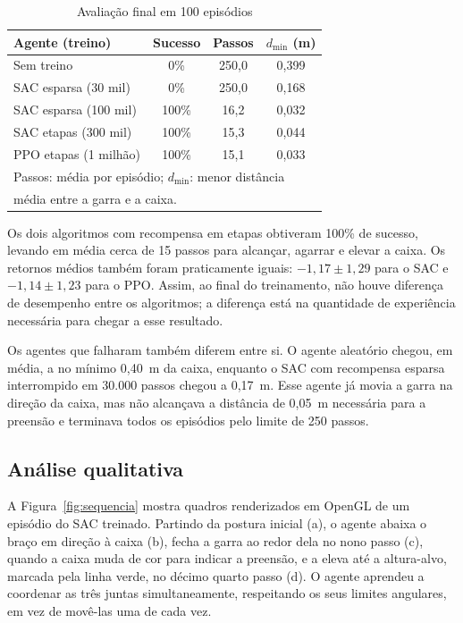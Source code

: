 \documentclass[conference]{IEEEtran}
\begin{document}
\begin{table}[htb]
    \centering
    \caption{Avaliação final em 100 episódios}
    \label{tab:final}
    \begin{tabular}{lccc}
        \hline
        Agente (treino) & Sucesso & Passos & $d_{\min}$ (m) \\
        \hline
        Sem treino                & 0\%   & 250,0 & 0,399 \\
        SAC esparsa (30 mil)      & 0\%   & 250,0 & 0,168 \\
        SAC esparsa (100 mil)     & 100\% & 16,2  & 0,032 \\
        SAC etapas (300 mil)      & 100\% & 15,3  & 0,044 \\
        PPO etapas (1 milhão)     & 100\% & 15,1  & 0,033 \\
        \hline
        \multicolumn{4}{l}{\footnotesize Passos: média por episódio; $d_{\min}$: menor distância} \\
        \multicolumn{4}{l}{\footnotesize média entre a garra e a caixa.}
    \end{tabular}
\end{table}

Os dois algoritmos com recompensa em etapas obtiveram 100\% de sucesso, levando em média cerca de 15 passos para alcançar, agarrar e elevar a caixa. Os retornos médios também foram praticamente iguais: $-1{,}17 \pm 1{,}29$ para o SAC e $-1{,}14 \pm 1{,}23$ para o PPO. Assim, ao final do treinamento, não houve diferença de desempenho entre os algoritmos; a diferença está na quantidade de experiência necessária para chegar a esse resultado.

Os agentes que falharam também diferem entre si. O agente aleatório chegou, em média, a no mínimo 0,40~m da caixa, enquanto o SAC com recompensa esparsa interrompido em 30.000 passos chegou a 0,17~m. Esse agente já movia a garra na direção da caixa, mas não alcançava a distância de 0,05~m necessária para a preensão e terminava todos os episódios pelo limite de 250 passos.

\subsection{Análise qualitativa}

A Figura~\ref{fig:sequencia} mostra quadros renderizados em OpenGL de um episódio do SAC treinado. Partindo da postura inicial (a), o agente abaixa o braço em direção à caixa (b), fecha a garra ao redor dela no nono passo (c), quando a caixa muda de cor para indicar a preensão, e a eleva até a altura-alvo, marcada pela linha verde, no décimo quarto passo (d). O agente aprendeu a coordenar as três juntas simultaneamente, respeitando os seus limites angulares, em vez de movê-las uma de cada vez.
\end{document}
